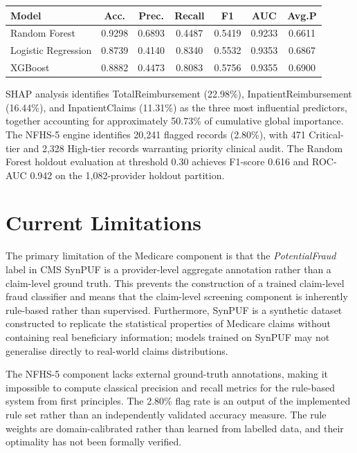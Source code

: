 \begin{center}
\begin{tabular}{|l|c|c|c|c|c|c|}
\hline
\textbf{Model} & \textbf{Acc.} & \textbf{Prec.} & \textbf{Recall} & \textbf{F1} & \textbf{AUC} & \textbf{Avg.P} \\
\hline
Random Forest       & 0.9298 & 0.6893 & 0.4487 & 0.5419 & 0.9233 & 0.6611 \\
Logistic Regression & 0.8739 & 0.4140 & 0.8340 & 0.5532 & 0.9353 & 0.6867 \\
XGBoost             & 0.8882 & 0.4473 & 0.8083 & 0.5756 & 0.9355 & 0.6900 \\
\hline
\end{tabular}
\end{center}

SHAP analysis identifies TotalReimbursement (22.98\%), InpatientReimbursement (16.44\%), and InpatientClaims (11.31\%) as the three most influential predictors, together accounting for approximately 50.73\% of cumulative global importance. The NFHS-5 engine identifies 20,241 flagged records (2.80\%), with 471 Critical-tier and 2,328 High-tier records warranting priority clinical audit. The Random Forest holdout evaluation at threshold 0.30 achieves F1-score 0.616 and ROC-AUC 0.942 on the 1,082-provider holdout partition.

\section{Current Limitations}

The primary limitation of the Medicare component is that the \textit{PotentialFraud} label in CMS SynPUF is a provider-level aggregate annotation rather than a claim-level ground truth. This prevents the construction of a trained claim-level fraud classifier and means that the claim-level screening component is inherently rule-based rather than supervised. Furthermore, SynPUF is a synthetic dataset constructed to replicate the statistical properties of Medicare claims without containing real beneficiary information; models trained on SynPUF may not generalise directly to real-world claims distributions.

The NFHS-5 component lacks external ground-truth annotations, making it impossible to compute classical precision and recall metrics for the rule-based system from first principles. The 2.80\% flag rate is an output of the implemented rule set rather than an independently validated accuracy measure. The rule weights are domain-calibrated rather than learned from labelled data, and their optimality has not been formally verified.

